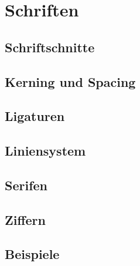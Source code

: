 \chapter{Schriften}
\label{ch:Schriften}


\section{Schriftschnitte}
\label{sec:Schnitte}

\section{Kerning und Spacing}
\label{sec:KernSpace}

\section{Ligaturen}

\section{Liniensystem}
\label{sec:Linien}

\section{Serifen}

\section{Ziffern}
\label{sec:Ziffern}

\section{Beispiele}

